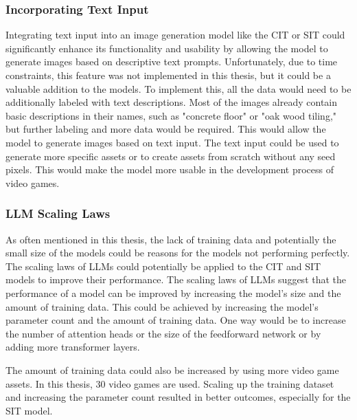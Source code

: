     \subsubsection{Incorporating Text Input}

    Integrating text input into an image generation model like the CIT or SIT could significantly enhance its functionality and usability by allowing the model to generate images based on descriptive text prompts. Unfortunately, due to time constraints, this feature was not implemented in this thesis, but it could be a valuable addition to the models. To implement this, all the data would need to be additionally labeled with text descriptions. Most of the images already contain basic descriptions in their names, such as "concrete floor" or "oak wood tiling," but further labeling and more data would be required. This would allow the model to generate images based on text input. The text input could be used to generate more specific assets or to create assets from scratch without any seed pixels. This would make the model more usable in the development process of video games.

    \subsubsection{LLM Scaling Laws}

    As often mentioned in this thesis, the lack of training data and potentially the small size of the models could be reasons for the models not performing perfectly. The scaling laws of LLMs \autocite{kaplan2020scaling} could potentially be applied to the CIT and SIT models to improve their performance. The scaling laws of LLMs suggest that the performance of a model can be improved by increasing the model's size and the amount of training data. This could be achieved by increasing the model's parameter count and the amount of training data. One way would be to increase the number of attention heads or the size of the feedforward network or by adding more transformer layers. 
    
    The amount of training data could also be increased by using more video game assets. In this thesis, 30 video games are used. Scaling up the training dataset and increasing the parameter count resulted in better outcomes, especially for the SIT model.
